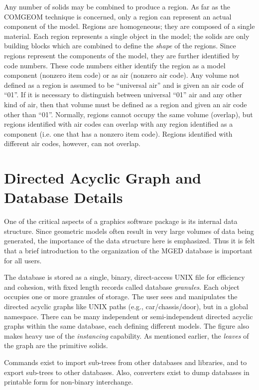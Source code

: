 Any number of solids may be combined to produce a region.
As far as the COMGEOM technique is concerned, only a region can
represent an actual component of the model.
Regions are homogeneous;  they are composed of a single material.
Each region represents a single object in the model;
the solids are only building blocks which are combined to
define the {\em shape} of the regions.
Since regions represent the components of the model, they
are further identified by code numbers.
These code numbers either identify the region as
a model component (nonzero item code)
or as air (nonzero air code).
Any volume not defined as a region is assumed to be ``universal air'' and
is given an air code of ``01''.
If it is necessary to distinguish between universal ``01'' air and any
other kind of air, then that volume must be defined as a region
and given an air code other than ``01''.
Normally, regions cannot occupy the same volume (overlap),
but regions identified with
air codes can overlap with any region identified as a component
(i.e. one that has a nonzero item code).
Regions identified with different air codes, however, can not overlap.

\section{Directed Acyclic Graph and Database Details}

One of the critical aspects of a graphics software package
is its internal data structure.
Since geometric models often result
in very large volumes of data being generated,
the importance of the data structure here is emphasized.
Thus it is felt that a brief introduction to the
organization of the MGED database is
important for all users.

The database is stored as a single,
binary, direct-access
UNIX file for efficiency and cohesion,
with fixed length records called database {\em granules}.
Each object occupies one or more granules of storage.
The user sees and manipulates the directed acyclic graphs
like UNIX paths (e.g., car/chassis/door),
but in a global namespace.
There can be many independent or semi-independent
directed acyclic graphs within the same database,
each defining different models.
The figure also makes heavy use of the {\em instancing} capability.
As mentioned earlier, the
{\em leaves} of the graph are the primitive solids.

Commands exist to import sub-trees from other databases and libraries,
and to export sub-trees to other databases.
Also, converters exist to dump databases in printable form for
non-binary interchange.

